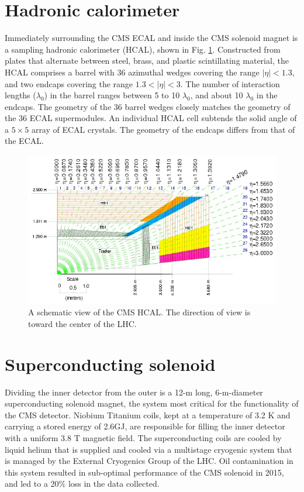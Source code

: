 \section{Hadronic calorimeter}
Immediately surrounding the CMS ECAL and inside the CMS solenoid magnet is a sampling hadronic calorimeter (HCAL), shown in Fig. \ref{fig:HCalLayout}. Constructed from plates that alternate between steel, brass, and plastic scintillating material, the HCAL comprises a barrel with 36 azimuthal wedges covering the range $|\eta|<1.3$, and two endcaps covering the range $1.3<|\eta|<3$. The number of interaction lengths ($\lambda_{0}$) in the barrel ranges between 5 to 10 $\lambda_{0}$, and about 10 $\lambda_{0}$ in the endcaps. The geometry of the 36 barrel wedges closely matches the geometry of the 36 ECAL supermodules. An individual HCAL cell subtends the solid angle of a $5\times5$ array of ECAL crystals. The geometry of the endcaps differs from that of the ECAL.
\begin{figure}[h]
\centering
\includegraphics[width=0.95\linewidth]{figures/CMS/HCalLayout.jpg}
\caption{A schematic view of the CMS HCAL. The direction of view is toward the center of the LHC.} 
\label{fig:HCalLayout}
\end{figure}


\section{Superconducting solenoid}
Dividing the inner detector from the outer is a 12-m long, 6-m-diameter superconducting solenoid magnet, the system most critical for the functionality of the CMS detector. Niobium Titanium coils, kept at a temperature of 3.2 K and carrying a stored energy of 2.6GJ, are responsible for filling the inner detector with a uniform 3.8 T magnetic field. The superconducting coils are cooled by liquid helium that is supplied and cooled via a multistage cryogenic system that is managed by the External Cryogenics Group of the LHC. Oil contamination in this system resulted in sub-optimal performance of the CMS solenoid in 2015, and led to a 20\% loss in the data collected.

